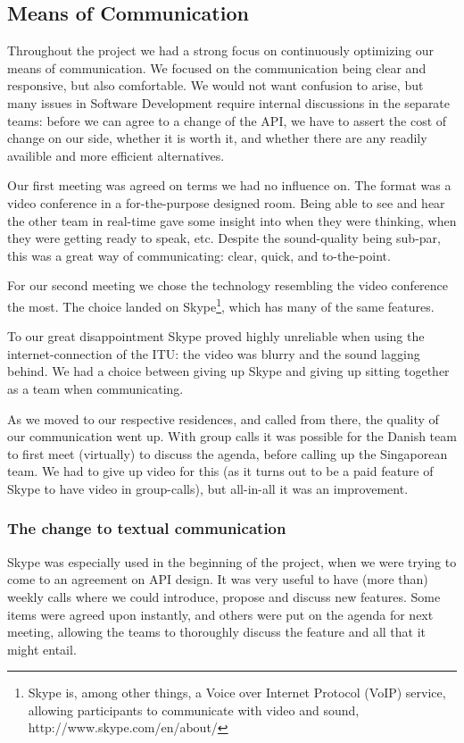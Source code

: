 \subsection{Means of Communication}

Throughout the project we had a strong focus on continuously optimizing our means of communication. We focused
on the communication being clear and responsive, but also comfortable. We would not want confusion to arise, but
many issues in Software Development require internal discussions in the separate teams: before we can agree to
a change of the API, we have to assert the cost of change on our side, whether it is worth it, and whether there
are any readily availible and more efficient alternatives.

Our first meeting was agreed on terms we had no influence on. The format was a video conference in a for-the-purpose
designed room. Being able to see and hear the other team in real-time gave some insight into when they were thinking,
when they were getting ready to speak, etc. Despite the sound-quality being sub-par, this was a great way of communicating:
clear, quick, and to-the-point.

For our second meeting we chose the technology resembling the video conference the most. The choice landed on Skype\footnote{
Skype is, among other things, a Voice over Internet Protocol (VoIP) service, allowing participants to communicate with video
and sound, http://www.skype.com/en/about/}, which has many of the same features.

To our great disappointment Skype proved highly unreliable when using the internet-connection of the ITU: the video was blurry
and the sound lagging behind. We had a choice between giving up Skype and giving up sitting together as a team when communicating.

As we moved to our respective residences, and called from there, the quality of our communication went up. With group calls it was
possible for the Danish team to first meet (virtually) to discuss the agenda, before calling up the Singaporean team. We had to give
up video for this (as it turns out to be a paid feature of Skype to have video in group-calls), but all-in-all it was an improvement.

\subsubsection{The change to textual communication}
Skype was especially used in the beginning of the project, when we were trying to come to an agreement on API design. It was very
useful to have (more than) weekly calls where we could introduce, propose and discuss new features. Some items were agreed upon instantly,
and others were put on the agenda for next meeting, allowing the teams to thoroughly discuss the feature and all that it might entail.


